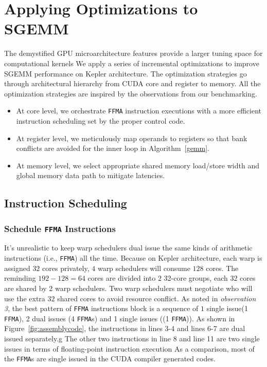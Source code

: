 \section{Applying Optimizations to SGEMM}
\label{sec:optimization}


The demystified GPU microarchitecture features provide a larger tuning space for computational kernels 
We apply
a series of incremental optimizations to improve SGEMM performance on Kepler architecture. The optimization strategies
go through architectural hierarchy from CUDA core and register to memory. All the optimization strategies are inspired by the observations from our benchmarking.
\begin{itemize}
\item At core level, we orchestrate {\tt FFMA} instruction executions with a more efficient instruction scheduling set by the proper control code.
\item At register level, we meticulously map operands to registers so that bank conflicts are avoided for the inner loop in Algorithm~\ref{gemm}.
\item At memory level, we select appropriate shared memory load/store width and global memory data path to mitigate
latencies.
\end{itemize}

\subsection{Instruction Scheduling}
\subsubsection{Schedule {\tt FFMA} Instructions}
It's unrealistic to keep warp schedulers dual issue the same kinds of arithmetic instructions (i.e., {\tt FFMA}) all
the time. Because on Kepler architecture, each warp is assigned $32$ cores privately, $4$ warp schedulers will consume
$128$ cores. The reminding $192-128=64$ cores are divided into $2$ 32-core groups, each $32$ cores
are shared by $2$ warp schedulers. Two warp schedulers must negotiate who will use the extra $32$ shared cores to avoid
resource conflict.
As noted in {\em observation 3}, the best pattern of {\tt FFMA} instructions block is a sequence of $1$ single issue(1
{\tt FFMA}), 2 dual issues (4 {\tt FFMA}s) and 1 single issues ((1 {\tt FFMA})). As shown in
Figure~\ref{fig:assemblycode}, the instructions in lines 3-4 and lines 6-7 are dual issued separately.g
The other two instructions in line 8 and line 11 are two single issues in terms of floating-point instruction
execution
As a comparison, most of the {\tt FFMA}s are single issued in the CUDA compiler generated codes.

